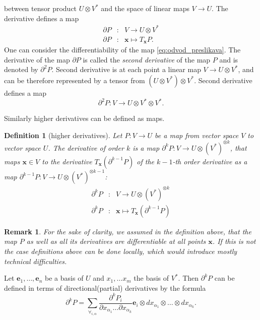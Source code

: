 \documentclass[preprint,12pt]{elsarticle}
\newcommand{\e}{\mathbf{e}}
\newcommand{\x}{\mathbf{x}}
\newcommand{\D}{\partial}
\newtheorem{definicija}{Definition}[section]
\newtheorem{opomba}{Remark}[section]
\begin{document}
between tensor product $U\otimes V^*$ and the space of linear maps $V\to U$. The derivative defines a map
\begin{eqnarray}
  \label{eq:odvod_preslikava}
  \D P&:& V\to U\otimes V^*\\
  \D P&:& \x \mapsto T_\x P.
\end{eqnarray}
One can consider the differentiability of the map \eqref{eq:odvod_preslikava}.
The derivative of the map $\D P$ is called the \emph{second derivative}
of the map $P$ and is denoted by $\D^2P$. Second derivative is at each point a
linear map  $V\to U\otimes V^*$, and can be therefore 
represented by a tensor from $(U\otimes V^*)\otimes V^*$. Second derivative
defines a map 
$$\D^2 P:V\to U\otimes V^*\otimes V^*.$$ 

Similarly higher derivatives can be defined as maps.
\begin{definicija}[higher derivatives]
  Let $P:V\to U$ be a map from vector space $V$ to vector space $U$. 
The derivative of order $k$ is a map $\D^kP:V\to U\otimes(V^*)^{\otimes k}$,
that maps $\x\in V$ to the derivative  $T_\x(\D^{k-1}P)$ of the $k-1$-th order
derivative as a map $\D^{k-1}P: V\to U\otimes (V^*)^{\otimes k-1}$:
  \begin{eqnarray}\label{eq:partial}
    \label{eq:visji_odvod}
    \D^kP&:&V\to U\otimes (V^*)^{\otimes k}\\
    \D^kP&:&\x\mapsto T_\x\left( \D^{k-1}P \right)
  \end{eqnarray}
\end{definicija} 
\begin{opomba}
  For the sake of clarity, we assumed in the definition above, that the map $P$ as well as all its
  derivatives are differentiable at all points $\x$. If this is not the case
  definitions above can be done locally, which would introduce mostly technical difficulties.
\end{opomba}
Let $\e_1,\ldots,\e_n$ be a basis of $U$ and $x_1,\ldots x_m$ the basis of
$V^*$. Then $\D^kP$  can be defined in terms of
directional(partial) derivatives by the formula
\begin{equation}\label{eq:d}
	\partial^kP=\sum_{\forall_{i,\alpha}}\frac{\partial^k P_i}{\partial
	    x_{\alpha_1}\ldots \partial x_{\alpha_k}}\e_i\otimes
	  dx_{\alpha_1}\otimes\ldots \otimes dx_{\alpha_k}.
\end{equation}
\end{document}
